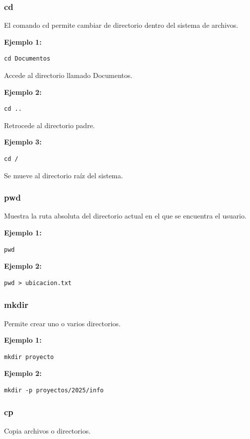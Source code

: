 \documentclass[12pt,a4paper]{article}
\begin{document}
\subsubsection{cd}
El comando cd permite cambiar de directorio dentro del sistema de archivos.

\textbf{Ejemplo 1:}
\begin{lstlisting}
cd Documentos
\end{lstlisting}

Accede al directorio llamado Documentos.

\textbf{Ejemplo 2:}
\begin{lstlisting}
cd ..
\end{lstlisting}

Retrocede al directorio padre.

\textbf{Ejemplo 3:}
\begin{lstlisting}
cd /
\end{lstlisting}

Se mueve al directorio raíz del sistema.
\subsubsection{pwd}
Muestra la ruta absoluta del directorio actual en el que se encuentra el usuario.

\textbf{Ejemplo 1:}
\begin{lstlisting}
pwd
\end{lstlisting}

\textbf{Ejemplo 2:}
\begin{lstlisting}
pwd > ubicacion.txt
\end{lstlisting}

\subsubsection{mkdir}
Permite crear uno o varios directorios.

\textbf{Ejemplo 1:}
\begin{lstlisting}
mkdir proyecto
\end{lstlisting}

\textbf{Ejemplo 2:}
\begin{lstlisting}
mkdir -p proyectos/2025/info
\end{lstlisting}

\subsubsection{cp}
Copia archivos o directorios.
\end{document}
